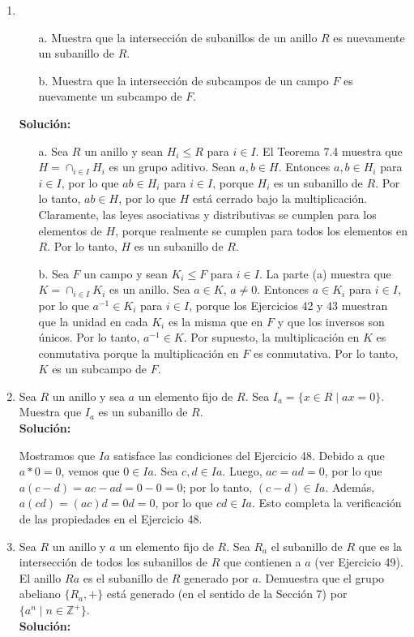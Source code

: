 \begin{enumerate}
	\item 	
	\begin{itemize}
		\item[a.] Muestra que la intersección de subanillos de un anillo $R$ es nuevamente un subanillo de $R$.
		\item[b.] Muestra que la intersección de subcampos de un campo $F$ es nuevamente un subcampo de $F$.
	\end{itemize}
	\textbf{Solución:}
	
	\begin{itemize}
		\item[a.] Sea $R$ un anillo y sean $H_i \leq R$ para $i \in I$. El Teorema 7.4 muestra que $H = \cap_{i\in I} H_i$ es un grupo aditivo. Sean $a, b \in H$. Entonces $a, b \in H_i$ para $i \in I$, por lo que $ab \in H_i$ para $i \in I$, porque $H_i$ es un subanillo de $R$. Por lo tanto, $ab \in H$, por lo que $H$ está cerrado bajo la multiplicación. Claramente, las leyes asociativas y distributivas se cumplen para los elementos de $H$, porque realmente se cumplen para todos los elementos en $R$. Por lo tanto, $H$ es un subanillo de $R$.
		\item[b.] 	Sea $F$ un campo y sean $K_i \leq F$ para $i \in I$. La parte (a) muestra que $K = \cap_{i\in I} K_i$ es un anillo. Sea $a \in K$, $a \neq 0$. Entonces $a \in K_i$ para $i \in I$, por lo que $a^{-1} \in K_i$ para $i \in I$, porque los Ejercicios 42 y 43 muestran que la unidad en cada $K_i$ es la misma que en $F$ y que los inversos son únicos. Por lo tanto, $a^{-1} \in K$. Por supuesto, la multiplicación en $K$ es conmutativa porque la multiplicación en $F$ es conmutativa. Por lo tanto, $K$ es un subcampo de $F$.
	\end{itemize}
	\item Sea $R$ un anillo y sea $a$ un elemento fijo de $R$. Sea $I_a = \{x \in R \mid ax = 0\}$. Muestra que $I_a$ es un subanillo de $R$.
	\\ \textbf{Solución:}
	
	Mostramos que $Ia$ satisface las condiciones del Ejercicio 48. Debido a que $a*0 = 0$, vemos que $0 \in Ia$. Sea $c, d \in Ia$. Luego, $ac = ad = 0$, por lo que $a(c - d) = ac - ad = 0 - 0 = 0$; por lo tanto, $(c - d) \in Ia$. Además, $a(cd) = (ac)d = 0d = 0$, por lo que $cd \in Ia$. Esto completa la verificación de las propiedades en el Ejercicio 48.
	
	
	\item Sea $R$ un anillo y $a$ un elemento fijo de $R$. Sea $R_a$ el subanillo de $R$ que es la intersección de todos los subanillos de $R$ que contienen a $a$ (ver Ejercicio 49). El anillo $Ra$ es el subanillo de $R$ generado por $a$. Demuestra que el grupo abeliano $\{R_a, +\}$ está generado (en el sentido de la Sección 7) por $\{a^n \mid n \in \mathbb{Z}^+\}$.
	\\ \textbf{Solución:}
	

\end{enumerate}
